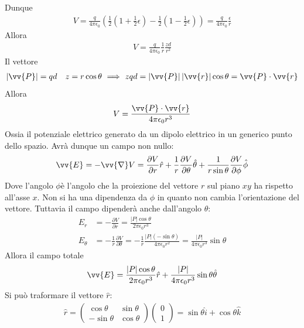 \documentclass[a4paper, oneside]{article}
\begin{document}
Dunque
\begin{gather*}
    V = \frac{q}{4\pi\epsilon_0 } \left(\frac{1}{2} \left(1 + \frac{1}{2} \epsilon\right) - \frac{1}{2}\left(1 - \frac{1}{2}\epsilon\right)\right) = \frac{q}{4\pi\epsilon_0} \frac{\epsilon}{r}
\end{gather*}
Allora
\begin{gather*}
    V = \frac{q}{4\pi\epsilon_0} \frac{1}{r} \frac{zd}{r^{2}}
\end{gather*}
Il vettore 
\begin{gather*}
    \left| \vv{P} \right| = qd \quad z = r\cos\theta \ \Longrightarrow \ zqd = \left| \vv{P}  \right| \left| \vv{r}  \right| \cos\theta = \vv{P} \cdot \vv{r}     
\end{gather*}
Allora
\begin{gather*}
    V = \frac{\vv{P} \cdot \vv{r}  }{4\pi\epsilon_0 r^{3}}
\end{gather*}
Ossia il potenziale elettrico generato da un dipolo elettrico in un generico punto dello spazio. Avrà dunque un campo 
non nullo:
\begin{gather*}
    \vv{E} = -\vv{\nabla}V = \frac{\partial V}{\partial r}\hat{r} + \frac{1}{r} \frac{\partial V}{\partial \theta} \hat{\theta} + \frac{1}{r\sin\theta}\frac{\partial V}{\partial \phi}\hat{\phi}        
\end{gather*}
Dove l'angolo $\phi $è l'angolo che la proiezione del vettore $r$ sul piano $xy$ ha rispetto all'asse $x$. Non si ha una dipendenza da $\phi$
in quanto non cambia l'orientazione del vettore. Tuttavia il campo dipenderà anche dall'angolo $\theta$:
\begin{align*}
    E_r &= -\frac{\partial V}{\partial r} = \frac{\left| P \right| \cos\theta }{2\pi\epsilon_0 r^{3}} \\
    E_\theta &= -\frac{1}{r} \frac{\partial V}{\partial \theta} = -\frac{1}{r} \frac{\left| P \right| (-\sin\theta) }{ 4\pi\epsilon_0 r^{2}} = \frac{\left| P \right| }{4\pi\epsilon_0 r^{3}} \sin\theta
\end{align*}
Allora il campo totale
\begin{gather*}
    \vv{E}  = \frac{\left| P \right| \cos\theta }{2\pi\epsilon_0 r^{3}} \hat{r}  + \frac{\left| P \right| }{4\pi\epsilon_0 r^{3}} \sin\theta \hat{\theta} 
\end{gather*}
Si può traformare il vettore $\hat{r}$:
\begin{gather*}
    \hat{r} = \begin{pmatrix}
        \cos\theta & \sin\theta \\
        -\sin\theta & \cos\theta
    \end{pmatrix}  \begin{pmatrix}
        0 \\
        1
    \end{pmatrix} = \sin\theta \hat{i} + \cos\theta \hat{k} 
\end{gather*} 
\end{document}
